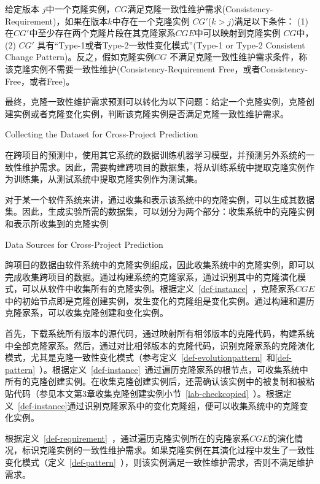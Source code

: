 \begin{definition}[克隆一致性维护需求] 
 \label{def-requirement}
给定版本 $j$中一个克隆实例，$CG$满足克隆一致性维护需求(Consistency-Requirement)，如果在版本$k$中存在一个克隆实例 $CG'$($k>j$)满足以下条件： (1) 在$CG'$中至少存在两个克隆片段在其克隆家系$CGE$中可以映射到克隆实例 $CG$中， (2) $CG'$ 具有“Type-1或者Type-2一致性变化模式”(Type-1 or Type-2 Consistent Change Pattern)。反之，假如克隆实例$CG$ 不满足克隆一致性维护需求条件，称该克隆实例不需要一致性维护(Consistency-Requirement Free，或者Consistency-Free，或者Free)。
\end{definition}

最终，克隆一致性维护需求预测可以转化为以下问题：给定一个克隆实例，克隆创建实例或者克隆变化实例，判断该克隆实例是否满足克隆一致性维护需求。

{Collecting the Dataset for Cross-Project Prediction}

在跨项目的预测中，使用其它系统的数据训练机器学习模型，并预测另外系统的一致性维护需求。因此，需要构建跨项目的数据集，将从训练系统中提取克隆实例作为训练集，从测试系统中提取克隆实例作为测试集。

对于某一个软件系统来讲，通过收集和表示该系统中的克隆实例，可以生成其数据集。因此，生成实验所需的数据集，可以划分为两个部分：收集系统中的克隆实例和表示所收集到的克隆实例

{Data Sources for Cross-Project Prediction}

跨项目的数据由软件系统中的克隆实例组成，因此收集系统中的克隆实例，即可以完成收集跨项目的数据。通过构建系统的克隆家系，通过识别其中的克隆演化模式，可以从软件中收集所有的克隆实例。根据定义~\ref{def-instance}~，克隆家系$CGE$中的初始节点即是克隆创建实例，发生变化的克隆组是变化实例。通过构建和遍历克隆家系，可以收集克隆创建和变化实例。

首先，下载系统所有版本的源代码，通过映射所有相邻版本的克隆代码，构建系统中全部克隆家系。然后，通过对比相邻版本的克隆代码，识别克隆家系的克隆演化模式，尤其是克隆一致性变化模式（参考定义~\ref{def-evolutionpattern}~和\ref{def-pattern}~）。根据定义~\ref{def-instance}~通过遍历克隆家系的根节点，可收集系统中所有的克隆创建实例。在收集克隆创建实例后，还需确认该实例中的被复制和被粘贴代码（参见本文第3章收集克隆创建实例小节~\ref{lab-checkcopied}~）。根据定义~\ref{def-instance}通过识别克隆家系中的变化克隆组，便可以收集系统中的克隆变化实例。

根据定义~\ref{def-requirement}~，通过遍历克隆实例所在的克隆家系$CGE$的演化情况，标识克隆实例的一致性维护需求。如果克隆实例在其演化过程中发生了一致性变化模式（定义~\ref{def-pattern}~），则该实例满足一致性维护需求，否则不满足维护需求。

